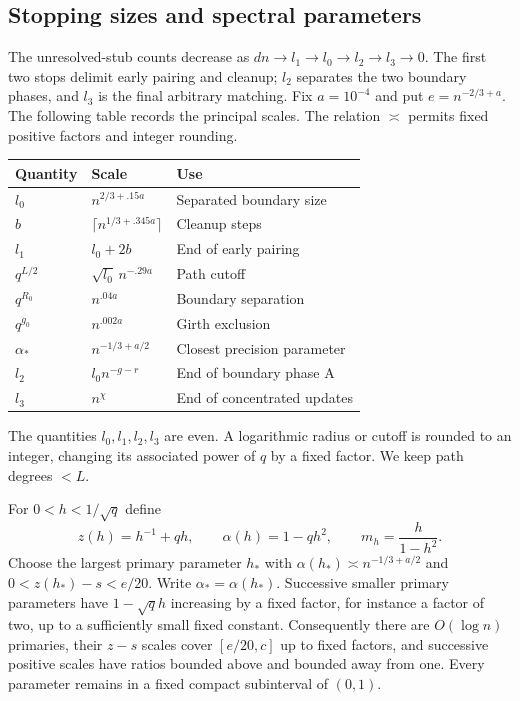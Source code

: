 \subsection{Stopping sizes and spectral parameters}
The unresolved-stub counts decrease as
$dn\to l_1\to l_0\to l_2\to l_3\to0$.
The first two stops delimit early pairing and cleanup; $l_2$ separates
the two boundary phases, and $l_3$ is the final arbitrary matching.
Fix $a=10^{-4}$ and put $e=n^{-2/3+a}$.  The following table records the
principal scales.  The relation $\asymp$ permits fixed positive factors
and integer rounding.
\begin{center}
\begin{tabular}{lll}
\toprule
Quantity&Scale&Use\\
\midrule
$l_0$&$n^{2/3+.15a}$&Separated boundary size\\
$b$&$\lceil n^{1/3+.345a}\rceil$&Cleanup steps\\
$l_1$&$l_0+2b$&End of early pairing\\
$q^{L/2}$&$\sqrt{l_0}\,n^{-.29a}$&Path cutoff\\
$q^{R_0}$&$n^{.04a}$&Boundary separation\\
$q^{g_0}$&$n^{.002a}$&Girth exclusion\\
$\alpha_*$&$n^{-1/3+a/2}$&Closest precision parameter\\
$l_2$&$l_0 n^{-g-r}$&End of boundary phase A\\
$l_3$&$n^\chi$&End of concentrated updates\\
\bottomrule
\end{tabular}
\end{center}
The quantities $l_0,l_1,l_2,l_3$ are even.  A logarithmic radius or cutoff
is rounded to an integer, changing its associated power of $q$ by a fixed
factor.  We keep path degrees $<L$.

For $0<h<1/\sqrt q$ define
\[
 z(h)=h^{-1}+qh,\qquad \alpha(h)=1-qh^2,
 \qquad m_h=\frac{h}{1-h^2}.
\]
Choose the largest primary parameter $h_*$ with
$\alpha(h_*)\asymp n^{-1/3+a/2}$ and
$0<z(h_*)-s<e/20$.  Write $\alpha_* = \alpha(h_*)$.
Successive smaller primary parameters have $1-\sqrt qh$ increasing by a
fixed factor, for instance a factor of two, up to a sufficiently small
fixed constant.  Consequently there are $O(\log n)$ primaries, their
$z-s$ scales cover $[e/20,c]$ up to fixed factors, and successive positive
scales have ratios bounded above and bounded away from one.  Every
parameter remains in a fixed compact subinterval of $(0,1)$.

